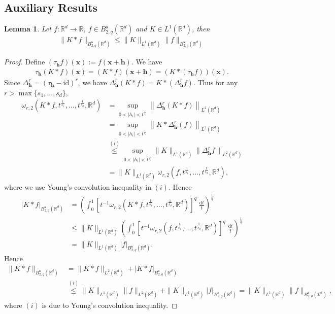 \documentclass[11pt]{article}
\newcommand{\bx}{\mathbf x}
\newcommand{\R}{\mathbb{R}}
\newcommand{\0}{\mathbf{0}}
\newcommand{\bs}{\boldsymbol{s}}
\newtheorem{lem}{Lemma}[section]
\begin{document}
\begin{appendix}
\subsection{Auxiliary Results}
\begin{lem}\label{lem:besov_young}
Let $f:\R^d\to\R$, $f\in B_{2,q}^{\bs}(\R^d)$ and $K\in L^1(\R^d)$, then 
\begin{align*} 
    \|K\ast f \|_{B_{2,q}^{\bs}(\R^d)} \leq \|K\|_{L^1(\R^d)}\|f\|_{B_{2,q}^{\bs}(\R^d)}
\end{align*}
\end{lem}
\begin{proof}
Define $(\tau_{\mathbf{h}}f)(\bx) := f(\bx + \mathbf{h})$. We have
\begin{align*}
    \tau_{\mathbf{h}}(K\ast f)(\bx) = (K\ast f)(\bx + \mathbf{h}) = (K \ast (\tau_{\mathbf{h}}f))(\bx) .
\end{align*}
Since $\Delta^{r}_{\mathbf{h}} = (\tau_{\mathbf{h}} - \mathrm{id})^r$, we have $\Delta^{r}_{\mathbf{h}}(K\ast f) = K\ast \left(\Delta^{r}_{\mathbf{h}}f\right)$. Thus for any $r > \max\{s_1, \ldots, s_d\}$, 
\begin{align}
    \omega_{r,2}\left(K\ast f, t^{\frac{1}{s_1}},\dots, t^{\frac{1}{s_d}}, \R^d\right) &= \sup_{0<|h_i|<t^{\frac{1}{s_i}}}\left\|\Delta^{r}_{\mathbf{h}}(K\ast f)\right\|_{L^2(\R^d)}\nonumber\\
    &= \sup_{0<|h_i|<t^{\frac{1}{s_i}}}\left\|K\ast \Delta^{r}_{\mathbf{h}}( f)\right\|_{L^2(\R^d)}\nonumber\\
    &\stackrel{(i)}{\leq} \sup_{0<|h_i|< t^{\frac{1}{s_i}}}\|K\|_{L^1(\R^d)} \left\|\Delta^{r}_{\mathbf{h}}f\right\|_{L^2(\R^d)}\label{eq:lem_young_besov_modified}\\
    &= \|K\|_{L^1(\R^d)}\omega_{r,2}\left(f,t^{\frac{1}{s_1}},\dots, t^{\frac{1}{s_d}},\R^d\right), \nonumber
\end{align}
where we use Young's convolution inequality in $(i)$. Hence
\begin{align*}
    |K\ast f|_{B_{2,q}^{\bs}(\R^d)} &= \left(\int_{0}^{1}\left[t^{-1}\omega_{r,2}\left(K\ast f,t^{\frac{1}{s_1}},\dots, t^{\frac{1}{s_d}},\R^d\right)\right]^q\;\frac{\mathrm{d}t}{t}\right)^{\frac{1}{q}}\\
    &\leq \|K\|_{L^1(\R^d)}\left(\int_{0}^{1}\left[t^{-1}\omega_{r,2}\left(f,t^{\frac{1}{s_1}},\dots, t^{\frac{1}{s_d}},\R^d\right)\right]^q\;\frac{\mathrm{d}t}{t}\right)^{\frac{1}{q}} \\
    &= \|K\|_{L^1(\R^d)}|f|_{B^{\bs}_{2,q}(\R^d)} .
\end{align*}
Hence
\begin{align*}
    \|K\ast f\|_{B^{\bs}_{2,q}(\mathbb{R}^d)} &= \|K\ast f\|_{L^2(\mathbb{R}^d)} + |K\ast f|_{B^{\bs}_{2,q}(\mathbb{R}^d)}\\
    &\stackrel{(i)}{\leq}  \|K\|_{L^1(\mathbb{R}^d)}\|f\|_{L^2(\mathbb{R}^d)} + \|K\|_{L^1(\mathbb{R}^d)}|f|_{B^{\bs}_{2,q}(\mathbb{R}^d)} = \|K\|_{L^1(\mathbb{R}^d)}\|f\|_{B^{\bs}_{2,q}(\mathbb{R}^d)},
\end{align*}
where $(i)$ is due to Young's convolution inequality.
\end{proof}


\end{appendix}
\end{document}
